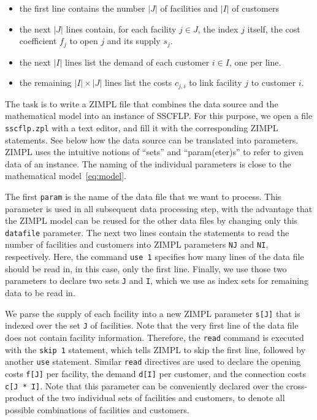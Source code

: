 \documentclass[a4paper,10pt]{article}
\begin{document}
\begin{itemize}
  \item the first line contains the number $|J|$ of facilities and $|I|$ of customers
  \item the next $|J|$ lines contain, for each facility $j \in J$, the index $j$ itself, the cost coefficient $f_{j}$ to open $j$ and its supply $s_{j}$.
  \item the next $|I|$ lines list the demand of each customer $i \in I$, one per line.
  \item the remaining $|I| \times |J|$ lines list the costs $c_{j,i}$ to link facility $j$ to customer $i$.
\end{itemize}

The task is to write a ZIMPL file that combines the data source and the mathematical model into an instance of SSCFLP.
%
For this purpose, we open a file \texttt{sscflp.zpl} with a text editor, and fill it with the corresponding ZIMPL statements.
%
See below how the data source can be translated into parameters.
%
ZIMPL uses the intuitive notions of ``sets'' and ``param(eter)s''
to refer to given data of an instance.
%
The naming of the individual parameters is close to the mathematical model~\eqref{eq:model}.


  

The first \texttt{param} is the name of the data file that we want to process.
%
This parameter is used in all subsequent data processing step, with the advantage that the ZIMPL model can be reused for the other data files by changing only this \texttt{datafile} parameter.
%
The next two lines contain the statements to read the number of facilities and customers into ZIMPL parameters \texttt{NJ} and \texttt{NI}, respectively.
%
Here, the command \texttt{use 1} specifies how many lines of the data file should be read in, in this case, only the first line.
%
Finally, we use those two parameters to declare two sets \texttt{J} and \texttt{I}, which we use as index sets for remaining data to be read in.



We parse the supply of each facility into a new ZIMPL parameter \texttt{s[J]} that is indexed over the set \texttt{J} of facilities.
%
Note that the very first line of the data file does not contain facility information.
%
Therefore, the \texttt{read} command is executed with the \texttt{skip 1} statement, which tells ZIMPL to skip the first line, followed by another \texttt{use} statement.
%
Similar \texttt{read} directives are used to declare the opening costs \texttt{f[J]} per facility, the demand \texttt{d[I]} per customer, and the connection costs \texttt{c[J * I]}.
%
Note that this parameter can be conveniently declared over the cross-product of the two individual sets of facilities and customers,
to denote all possible combinations of facilities and customers.
%
\end{document}
